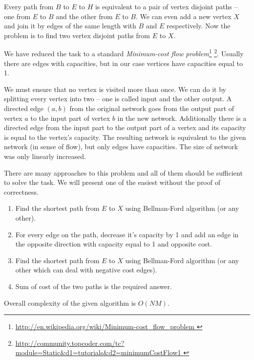 
Every path from $B$ to $E$ to $H$ is equivalent to a pair of vertex disjoint
paths -- one from $E$ to $B$ and the other from $E$ to $B$. We can even add 
a new vertex $X$ and join it by edges of the same length with $B$ and $E$
respectively. Now the problem is to find two vertex disjoint paths from
$E$ to $X$.

We have reduced the task to a standard
\emph{Minimum-cost flow problem}\footnote{\url{
  http://en.wikipedia.org/wiki/Minimum-cost_flow_problem
}}
\footnote{\url{
  http://community.topcoder.com/tc?module=Static&d1=tutorials&d2=minimumCostFlow1
}}.
Usually there are edges with capacities, but in our case vertices
have capacities equal to 1.


We must ensure that no vertex is visited more than once. We can do it by
splitting every vertex into two -- one is called input and the other output.
A directed edge $(a, b)$ from the original network goes from the output
part of vertex $a$ to the input part of vertex $b$ in the new network.
Additionally there is a directed edge from the input part to the output part
of a vertex and its capacity is equal to the vertex's capacity. The resulting
network is equivalent to the given network (in sense of flow), but only edges
have capacities. The size of network was only linearly increased.


There are many approaches to this problem and all of them should be sufficient
to solve the task. We will present one of the easiest without the proof of
correctness.

\begin{enumerate}
  \item Find the shortest path from $E$ to $X$ using Bellman-Ford
  algorithm (or any other).
  \item For every edge on the path,
  decrease it's capacity by 1 and add an edge in the opposite
  direction with capacity equal to 1 and opposite cost.
  \item Find the shortest path from $E$ to $X$ using Bellman-Ford
  algorithm (or any other which can deal with negative cost edges).
  \item Sum of cost of the two paths is the required answer.
\end{enumerate}

Overall complexity of the given algorithm is $O(NM)$.
